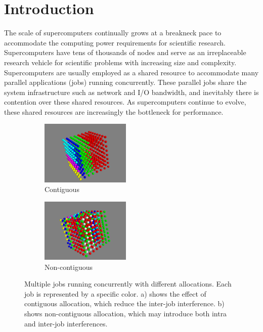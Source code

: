 \documentclass[conference]{IEEEtran}
\begin{document}
\section{Introduction} 
\label{sec: intro}

The scale of supercomputers continually grows at a breakneck pace to accommodate the computing power requirements for scientific research. Supercomputers have tens of thousands of nodes  and serve as an irreplaceable research vehicle for scientific problems with increasing size and complexity. Supercomputers are usually employed as a shared resource to accommodate many parallel applications (jobs) running concurrently.  These parallel jobs share the system infrastructure such as network and I/O bandwidth, and inevitably there is contention over these shared resources. As supercomputers continue to evolve, these shared resources are increasingly the bottleneck for performance.


\begin{figure}[h!]
    \centering
    \begin{subfigure}[t]{0.2\textwidth}
        \centering
        \includegraphics[height=1.2in]{figs/goodallocation}
        \caption{Contiguous}
        \label{fig:overview_sub1}
    \end{subfigure}%
    \hspace{1em}%
    \begin{subfigure}[t]{0.2\textwidth}
        \centering
        \includegraphics[height=1.2in]{figs/badallocation}
        \caption{Non-contiguous}
        \label{fig:overview_sub2}
    \end{subfigure}%
   \caption{Multiple jobs running concurrently with different allocations. Each job is represented by a specific color. a) shows the effect of contiguous allocation, which reduce the inter-job interference. b) shows non-contiguous allocation, which may introduce both intra and inter-job interferences. }
   \label{fig:overview}
\end{figure}
\end{document}

